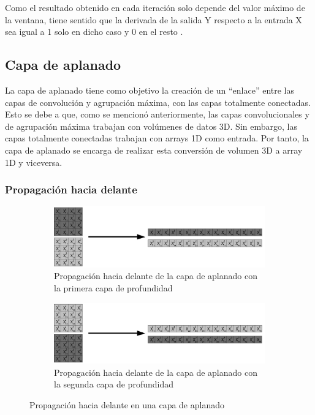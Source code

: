  
Como el resultado obtenido en cada iteración solo depende del valor máximo de la ventana, tiene sentido que la derivada de la salida Y respecto a la entrada X sea igual a 1 solo en dicho caso y 0 en el resto \cite{max_pool_backprop} \cite{max_pool_backprop_2}.
\subsection{Capa de aplanado}

La capa de aplanado tiene como objetivo la creación de un ``enlace'' entre las capas de convolución y agrupación máxima, con las capas totalmente conectadas. Esto se debe a que, como se mencionó anteriormente, las capas convolucionales y de agrupación máxima trabajan con volúmenes de datos 3D. Sin embargo, las capas totalmente conectadas trabajan con arrays 1D como entrada. Por tanto, la capa de aplanado se encarga de realizar esta conversión de volumen 3D a array 1D y viceversa. 

\subsubsection{Propagación hacia delante}
\begin{figure}[H]
	\centering
	\begin{subfigure}{.5\textwidth}
		\hspace{-10mm}
		\includegraphics[width=2\linewidth]{imagenes/flatten_1.jpg}  
		\caption{Propagación hacia delante de la capa de aplanado con la primera capa de profundidad}
	\end{subfigure}
	\begin{subfigure}{.5\textwidth}
		\hspace{-10mm}
		\includegraphics[width=2\linewidth]{imagenes/flatten_2.jpg}  
		\caption{Propagación hacia delante de la capa de aplanado con la segunda capa de profundidad}
	\end{subfigure}
	
	\caption{Propagación hacia delante en una capa de aplanado}
	\label{fig:forward_prop_flatten_canales_profundidad}
\end{figure}

